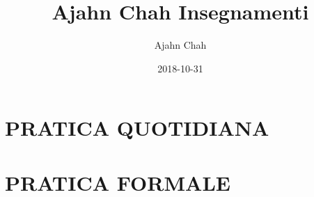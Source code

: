 \documentclass[
  final,
  babelLanguage=italian,
]{anecdote}
\title{Ajahn Chah Insegnamenti}
\subtitle{}
\author{Ajahn Chah}
\date{2018-10-31}%
\begin{document}
\frontmatter

\ifdesktopversion
{}
\fi







\cleartorecto
\tableofcontents*







\mainmatter

\part{PRATICA QUOTIDIANA}



































\part{PRATICA FORMALE}
\end{document}

